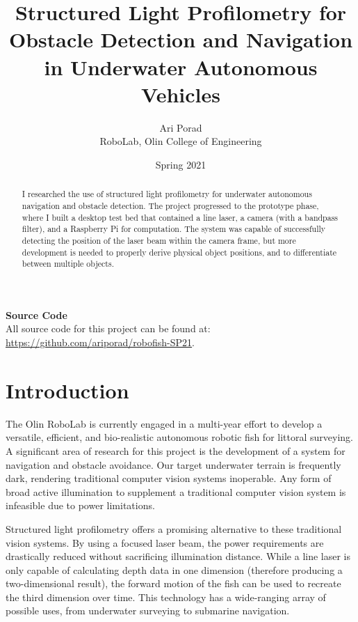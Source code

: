 \documentclass{article}
\title{Structured Light Profilometry for Obstacle Detection and Navigation in Underwater Autonomous Vehicles}
\author{Ari Porad\\RoboLab, Olin College of Engineering}
\date{Spring 2021}
\begin{document}
\maketitle

\begin{abstract}
    \label{abstract}
    I researched the use of structured light profilometry for underwater autonomous navigation and obstacle detection. The project progressed to the prototype phase, where I built a desktop test bed that contained a line laser, a camera (with a bandpass filter), and a Raspberry Pi for computation. The system was capable of successfully detecting the position of the laser beam within the camera frame, but more development is needed to properly derive physical object positions, and to differentiate between multiple objects.
\end{abstract}

\begin{center}
    \textbf{\small{Source Code}}\\
    \smallskip
    All source code for this project can be found at: \hyperlink{https://github.com/ariporad/robofish-SP21}{https://github.com/ariporad/robofish-SP21}.
\end{center}

\section{Introduction} \label{sec:intro}

The Olin RoboLab is currently engaged in a multi-year effort to develop a versatile, efficient, and bio-realistic autonomous robotic fish for littoral surveying. A significant area of research for this project is the development of a system for navigation and obstacle avoidance. Our target underwater terrain is frequently dark, rendering traditional computer vision systems inoperable. Any form of broad active illumination to supplement a traditional computer vision system is infeasible due to power limitations.

Structured light profilometry offers a promising alternative to these traditional vision systems. By using a focused laser beam, the power requirements are drastically reduced without sacrificing illumination distance. While a line laser is only capable of calculating depth data in one dimension (therefore producing a two-dimensional result), the forward motion of the fish can be used to recreate the third dimension over time. This technology has a wide-ranging array of possible uses, from underwater surveying to submarine navigation.
\end{document}
